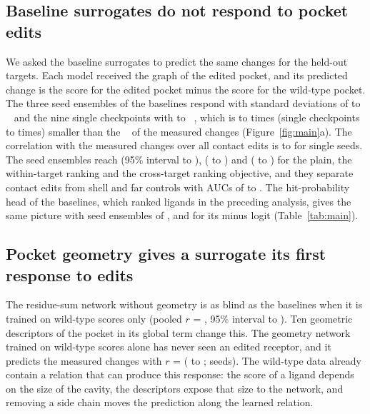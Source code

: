 \subsection{Baseline surrogates do not respond to pocket edits}

We asked the baseline surrogates to predict the same changes for the \nHeldTargets{} held-out targets. Each model received the graph of the edited pocket, and its predicted change is the score for the edited pocket minus the score for the wild-type pocket. The three seed ensembles of the baselines respond with standard deviations of \sdPredRefMin{} to \sdPredRefMax{}~\kcal{} and the nine single checkpoints with \sdCkptMin{} to \sdCkptMax{}~\kcal{}, which is \ratioSdRefMin{} to \ratioSdRefMax{} times (single checkpoints \ratioCkptMin{} to \ratioCkptMax{} times) smaller than the \sdTrue{}~\kcal{} of the measured changes (Figure~\ref{fig:main}a). The correlation with the measured changes over all contact edits is \rRefSeedMin{} to \rRefSeedMax{} for single seeds. The seed ensembles reach \rEnsCZero{} (95\% interval \rLoCZero{} to \rHiCZero{}), \rEnsCOne{} (\rLoCOne{} to \rHiCOne{}) and \rEnsCTwo{} (\rLoCTwo{} to \rHiCTwo{}) for the plain, the within-target ranking and the cross-target ranking objective, and they separate contact edits from shell and far controls with AUCs of \aucRefMin{} to \aucRefMax{}. The hit-probability head of the baselines, which ranked ligands in the preceding analysis, gives the same picture with seed ensembles of \rEnsCZeroL{}, \rEnsCOneL{} and \rEnsCTwoL{} for its minus logit (Table~\ref{tab:main}).


\subsection{Pocket geometry gives a surrogate its first response to edits}

The residue-sum network without geometry is as blind as the baselines when it is trained on wild-type scores only (pooled $r$ = \rEnsRsWt{}, 95\% interval \rLoRsWt{} to \rHiRsWt{}). Ten geometric descriptors of the pocket in its global term change this. The geometry network trained on wild-type scores alone has never seen an edited receptor, and it predicts the measured changes with $r$ = \rEnsRsgWt{} (\rLoRsgWt{} to \rHiRsgWt{}; \nSeedRsgWt{} seeds). The wild-type data already contain a relation that can produce this response: the score of a ligand depends on the size of the cavity, the descriptors expose that size to the network, and removing a side chain moves the prediction along the learned relation.


